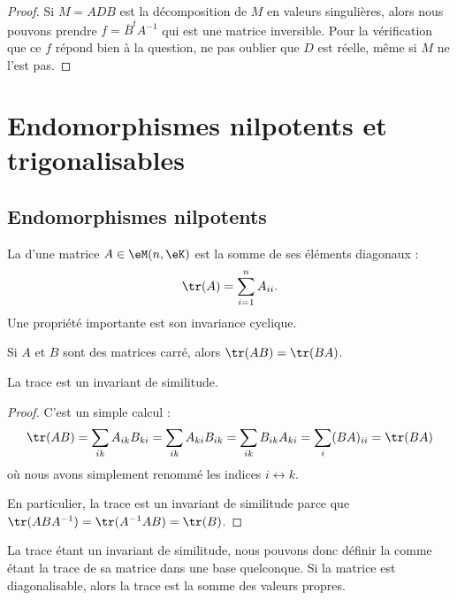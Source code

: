 \begin{proof}
    Si \( M=ADB\) est la décomposition de \( M\) en valeurs singulières, alors nous pouvons prendre \( f=\overline{ B }^tA^{-1}\) qui est une matrice inversible. Pour la vérification que ce \( f\) répond bien à la question, ne pas oublier que \( D\) est réelle, même si \( M\) ne l'est pas.
\end{proof}

\section{Endomorphismes nilpotents et trigonalisables}

\subsection{Endomorphismes nilpotents}

La  d'une matrice \( A\in \eM(n,\eK)\) est la somme de ses éléments diagonaux :
\begin{equation}
    \tr(A)=\sum_{i=1}^nA_{ii}.
\end{equation}
Une propriété importante est son invariance cyclique.
\begin{lemma}   \label{LemhbZTay}
    Si \( A\) et \( B\) sont des matrices carré, alors \( \tr(AB)=\tr(BA)\).

    La trace est un invariant de similitude.
\end{lemma}

\begin{proof}
    C'est un simple calcul :
    \begin{equation}
            \tr(AB)=\sum_{ik}A_{ik}B_{ki}
            =\sum_{ik}A_{ki}B_{ik} 
            =\sum_{ik}B_{ik}A_{ki}
            =\sum_i(BA)_{ii}
            =\tr(BA)
    \end{equation}
    où nous avons simplement renommé les indices \( i\leftrightarrow k\).

    En particulier, la trace est un invariant de similitude parce que \( \tr(ABA^{-1})=\tr(A^{-1} AB)=\tr(B)\). 
\end{proof}
La trace étant un invariant de similitude, nous pouvons donc définir la  comme étant la trace de sa matrice dans une base quelconque. Si la matrice est diagonalisable, alors la trace est la somme des valeurs propres.


